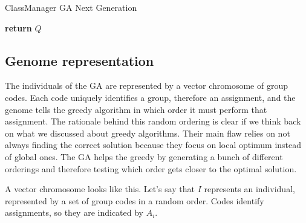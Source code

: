 \begin{algorithm}[H]
    \caption{ClassManager GA Next Generation}
    \label{cm-ga-ng}
    \begin{algorithmic}[1]
                \EndIf
                \EndIf
            \EndFor
            \State \textbf{return} $Q$
        \EndProcedure
    \end{algorithmic}
\end{algorithm}

\subsection{Genome representation}

The individuals of the GA are represented by a vector chromosome of group codes. Each code uniquely identifies a group, therefore an assignment, and the genome tells the greedy algorithm in which order it must perform that assignment. The rationale behind this random ordering is clear if we think back on what we discussed about greedy algorithms. Their main flaw relies on not always finding the correct solution because they focus on local optimum instead of global ones. The GA helps the greedy by generating a bunch of different orderings and therefore testing which order gets closer to the optimal solution.

A vector chromosome looks like this. Let's say that $I$ represents an individual, represented by a set of group codes in a random order. Codes identify assignments, so they are indicated by $A_{i}$.

